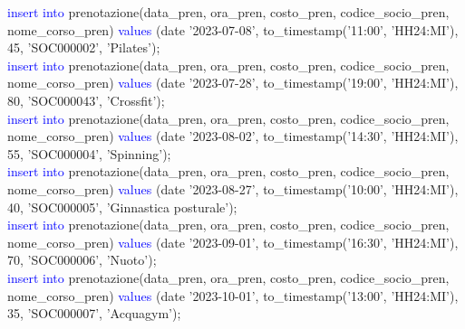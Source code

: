 \documentclass{article}
\begin{document}
\begin{flushleft}
{        \hspace*{0.5em}\textcolor{blue}{insert into} prenotazione(data\_pren, ora\_pren, costo\_pren, codice\_socio\_pren, \hspace*{0.5em}nome\_corso\_pren) \textcolor{blue}{values} (date '2023-07-08', to\_timestamp('11:00', 'HH24:MI'), 45, \hspace*{0.5em}'SOC000002', 'Pilates'); \\
        \vspace{2mm}
        \hspace*{0.5em}\textcolor{blue}{insert into} prenotazione(data\_pren, ora\_pren, costo\_pren, codice\_socio\_pren, \hspace*{0.5em}nome\_corso\_pren) \textcolor{blue}{values} (date '2023-07-28', to\_timestamp('19:00', 'HH24:MI'), 80, \hspace*{0.5em}'SOC000043', 'Crossfit'); \\
        \vspace{2mm}
        \hspace*{0.5em}\textcolor{blue}{insert into} prenotazione(data\_pren, ora\_pren, costo\_pren, codice\_socio\_pren, \hspace*{0.5em}nome\_corso\_pren) \textcolor{blue}{values} (date '2023-08-02', to\_timestamp('14:30', 'HH24:MI'), 55, \hspace*{0.5em}'SOC000004', 'Spinning'); \\
        \vspace{2mm}
        \hspace*{0.5em}\textcolor{blue}{insert into} prenotazione(data\_pren, ora\_pren, costo\_pren, codice\_socio\_pren, \hspace*{0.5em}nome\_corso\_pren) \textcolor{blue}{values} (date '2023-08-27', to\_timestamp('10:00', 'HH24:MI'), 40, \hspace*{0.5em}'SOC000005', 'Ginnastica posturale'); \\
        \vspace{2mm}
        \hspace*{0.5em}\textcolor{blue}{insert into} prenotazione(data\_pren, ora\_pren, costo\_pren, codice\_socio\_pren, \hspace*{0.5em}nome\_corso\_pren) \textcolor{blue}{values} (date '2023-09-01', to\_timestamp('16:30', 'HH24:MI'), 70, \hspace*{0.5em}'SOC000006', 'Nuoto'); \\
        \vspace{2mm}
        \hspace*{0.5em}\textcolor{blue}{insert into} prenotazione(data\_pren, ora\_pren, costo\_pren, codice\_socio\_pren, \hspace*{0.5em}nome\_corso\_pren) \textcolor{blue}{values} (date '2023-10-01', to\_timestamp('13:00', 'HH24:MI'), 35, \hspace*{0.5em}'SOC000007', 'Acquagym'); \\
}
\end{flushleft}
\end{document}
